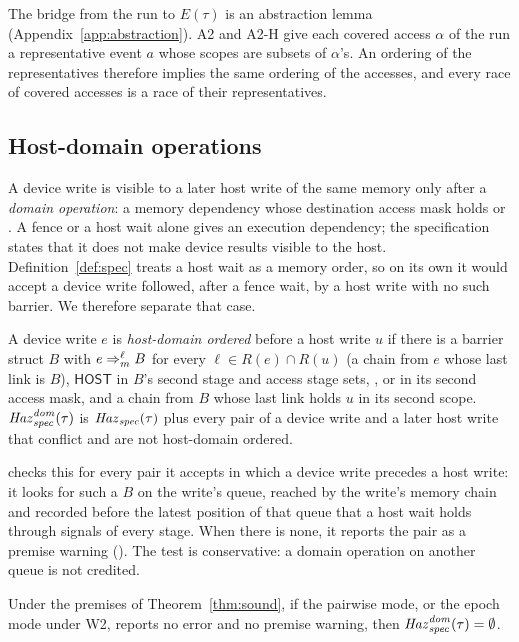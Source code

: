 The bridge from the run to $E(\tau)$ is an abstraction lemma (Appendix~\ref{app:abstraction}). A2 and A2-H give each
covered access $\alpha$ of the run a representative event $a$ whose scopes are subsets of $\alpha$'s. An ordering
of the representatives therefore implies the same ordering of the accesses, and every race of covered accesses is a
race of their representatives.

\subsection{Host-domain operations}
\label{sec:hostdom}
A device write is visible to a later host write of the same memory only after a \emph{domain operation}: a memory
dependency whose destination access mask holds  or . A fence or a host wait alone
gives an execution dependency; the specification states that it does not make device results visible to the host.
Definition~\ref{def:spec} treats a host wait as a memory order, so on its own it would accept a device write followed,
after a fence wait, by a host write with no such barrier. We therefore separate that case.

\begin{definition}\label{def:hostdom}
A device write $e$ is \emph{host-domain ordered} before a host write $u$ if there is a barrier struct $B$ with $e
\Rightarrow_{m}^{\ell} B$ for every $\ell \in R(e) \cap R(u)$ (a chain from $e$ whose last link is $B$), $\mathsf{HOST}$ in $B$'s
second stage and access stage sets, ,  or  in its second access
mask, and a chain from $B$ whose last link holds $u$ in its second scope. $\mathit{Haz}_{\mathit{spec}}^{\mathit{dom}}(\tau)$ is $\mathit{Haz}_{\mathit{spec}}(\tau)$ plus every pair of a device write and a later host write
that conflict and are not host-domain ordered.
\end{definition}

\sys checks this for every pair it accepts in which a device write precedes a host write: it looks for such a $B$ on
the write's queue, reached by the write's memory chain and recorded before the latest position of that queue that a
host wait holds through signals of every stage. When there is none, it reports the pair as a premise warning
(). The test is conservative: a domain operation on another queue is not credited.

\begin{proposition}\label{prop:hostdom}
Under the premises of Theorem~\ref{thm:sound}, if the pairwise mode, or the epoch mode under W2, reports no error and
no premise warning, then $\mathit{Haz}_{\mathit{spec}}^{\mathit{dom}}(\tau) = \emptyset$.
\end{proposition}


